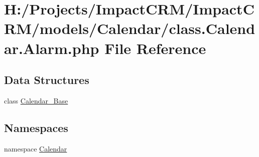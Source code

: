 \hypertarget{class_8Calendar_8Alarm_8php}{
\section{H:/Projects/ImpactCRM/ImpactCRM/models/Calendar/class.Calendar.Alarm.php File Reference}
\label{class_8Calendar_8Alarm_8php}
}
\subsection*{Data Structures}
\begin{DoxyCompactItemize}
\item 
class \hyperlink{classCalendar__Base}{Calendar\_\-Base}
\end{DoxyCompactItemize}
\subsection*{Namespaces}
\begin{DoxyCompactItemize}
\item 
namespace \hyperlink{namespaceCalendar}{Calendar}
\end{DoxyCompactItemize}
